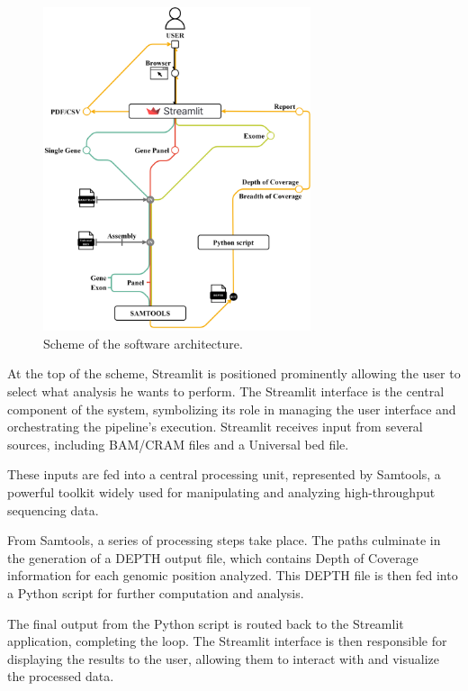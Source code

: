 \begin{figure}[H]
    \centering
    \includegraphics[width=0.7\textwidth]{figs/architecture.png}
    \caption{Scheme of the software architecture.} 
    \label{fig:architecture}
\end{figure}

At the top of the scheme, Streamlit is positioned prominently allowing the user to select what analysis he wants to perform. The Streamlit interface is the central component of the system, symbolizing its role in managing the user interface and orchestrating the pipeline's execution. Streamlit receives input from several sources, including BAM/CRAM files and a Universal \ac{bed} file.

These inputs are fed into a central processing unit, represented by Samtools, a powerful toolkit widely used for manipulating and analyzing high-throughput sequencing data.

From Samtools, a series of processing steps take place. The paths culminate in the generation of a DEPTH output file, which contains Depth of Coverage information for each genomic position analyzed. This DEPTH file is then fed into a Python script for further computation and analysis.

The final output from the Python script is routed back to the Streamlit application, completing the loop. The Streamlit interface is then responsible for displaying the results to the user, allowing them to interact with and visualize the processed data.

